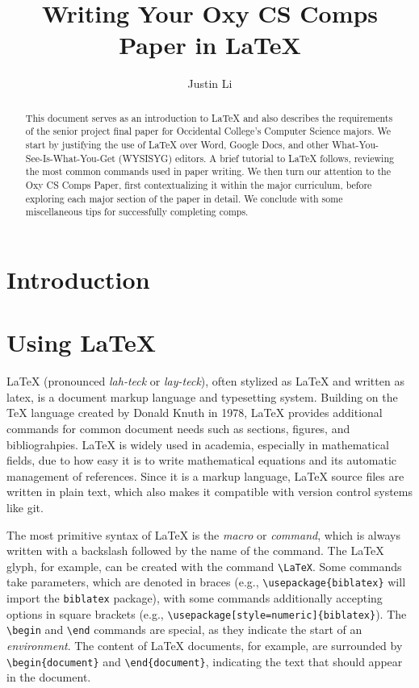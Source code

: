 \documentclass[10pt,twocolumn]{article}
\title{Writing Your Oxy CS Comps Paper in \LaTeX}
\author{Justin Li}
\affiliation{Occidental College}
\begin{document}
\maketitle

\begin{abstract}
    This document serves as an introduction to {\LaTeX} and also describes the requirements of the senior project final paper for Occidental College's Computer Science majors.
    We start by justifying the use of {\LaTeX} over Word, Google Docs, and other What-You-See-Is-What-You-Get (WYSISYG) editors.
    A brief tutorial to {\LaTeX} follows, reviewing the most common commands used in paper writing.
    We then turn our attention to the Oxy CS Comps Paper, first contextualizing it within the major curriculum, before exploring each major section of the paper in detail.
    We conclude with some miscellaneous tips for successfully completing comps.
\end{abstract}

\section{Introduction}

\section{Using \LaTeX}

LaTeX (pronounced \textit{lah-teck} or \textit{lay-teck}), often stylized as {\LaTeX} and written as latex, is a document markup language and typesetting system.
Building on the {\TeX} language created by Donald Knuth in 1978, LaTeX provides additional commands for common document needs such as sections, figures, and bibliograhpies.
LaTeX is widely used in academia, especially in mathematical fields, due to how easy it is to write mathematical equations and its automatic management of references.
Since it is a markup language, LaTeX source files are written in plain text, which also makes it compatible with version control systems like git.

The most primitive syntax of LaTeX is the \textit{macro} or \textit{command}, which is always written with a backslash followed by the name of the command.
The {\LaTeX} glyph, for example, can be created with the command \texttt{\textbackslash LaTeX}.
Some commands take parameters, which are denoted in braces (e.g., \texttt{\textbackslash usepackage\{biblatex\}} will import the \texttt{biblatex} package), with some commands additionally accepting options in square brackets (e.g., \texttt{\textbackslash usepackage[style=numeric]\{biblatex\}}).
The \texttt{\textbackslash begin} and \texttt{\textbackslash end} commands are special, as they indicate the start of an \textit{environment}.
The content of LaTeX documents, for example, are surrounded by \texttt{\textbackslash begin\{document\}} and \texttt{\textbackslash end\{document\}}, indicating the text that should appear in the document.
\end{document}
